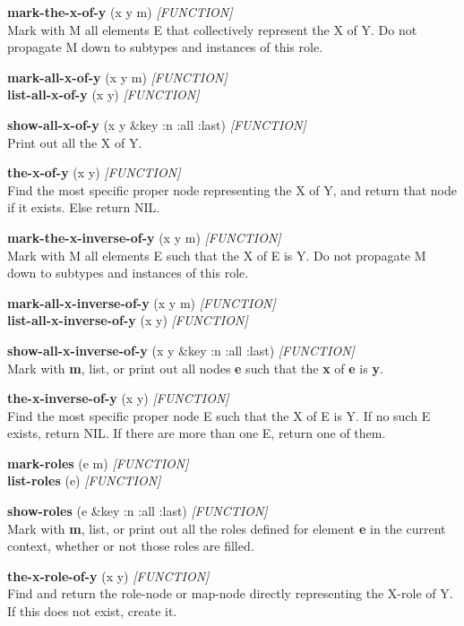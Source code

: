 \documentclass[titlepage,twoside,openright,11pt]{article}
\begin{document}
\textbf{mark-the-x-of-y} (x y m) \emph{{[}FUNCTION{]}}\\
Mark with M all elements E that collectively represent the X of Y. Do
not propagate M down to subtypes and instances of this role.

\textbf{mark-all-x-of-y} (x y m) \emph{{[}FUNCTION{]}\\
}\textbf{list-all-x-of-y} (x y) \emph{{[}FUNCTION{]}}

\textbf{show-all-x-of-y} (x y \&key :n :all :last)
\emph{{[}FUNCTION{]}}\\
Print out all the X of Y.

\textbf{the-x-of-y} (x y) \emph{{[}FUNCTION{]}}\\
Find the most specific proper node representing the X of Y, and return
that node if it exists. Else return NIL.

\textbf{mark-the-x-inverse-of-y} (x y m) \emph{{[}FUNCTION{]}}\\
Mark with M all elements E such that the X of E is Y. Do not propagate M
down to subtypes and instances of this role.

\textbf{mark-all-x-inverse-of-y} (x y m) \emph{{[}FUNCTION{]}}\\
\textbf{list-all-x-inverse-of-y} (x y) \emph{{[}FUNCTION{]}}

\textbf{show-all-x-inverse-of-y} (x y \&key :n :all :last)
\emph{{[}FUNCTION{]}}\\
Mark with \textbf{m}, list, or print out all nodes \textbf{e} such that
the \textbf{x} of \textbf{e} is \textbf{y}.

\textbf{the-x-inverse-of-y} (x y) \emph{{[}FUNCTION{]}}\\
Find the most specific proper node E such that the X of E is Y. If no
such E exists, return NIL. If there are more than one E, return one of
them.

\textbf{mark-roles} (e m) \emph{{[}FUNCTION{]}}\\
\textbf{list-roles} (e) \emph{{[}FUNCTION{]}}

\textbf{show-roles} (e \&key :n :all :last) \emph{{[}FUNCTION{]}}\\
Mark with \textbf{m}, list, or print out all the roles defined for
element \textbf{e} in the current context, whether or not those roles
are filled.

\textbf{the-x-role-of-y} (x y) \emph{{[}FUNCTION{]}}\\
Find and return the role-node or map-node directly representing the
X-role of Y. If this does not exist, create it.
\end{document}
